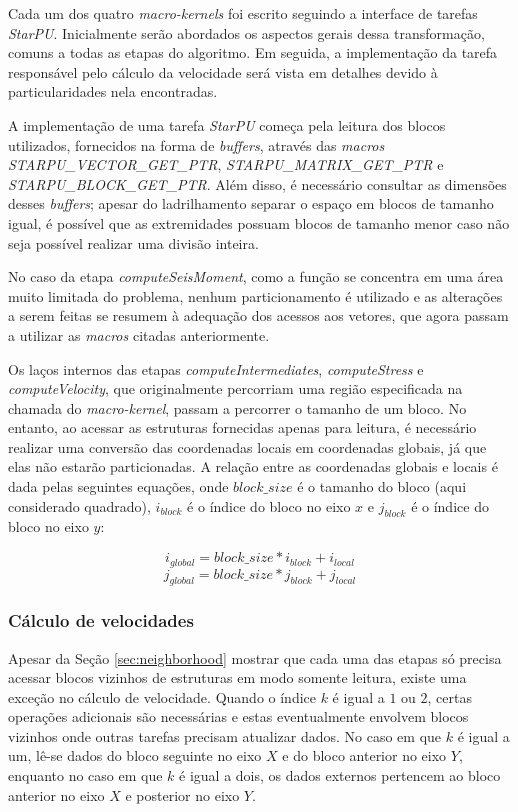 \documentclass[cic,tc]{iiufrgs}
\begin{document}
Cada um dos quatro \textit{macro-kernels} foi escrito seguindo a interface de tarefas \textit{StarPU}. Inicialmente serão abordados
os aspectos gerais dessa transformação, comuns a todas as etapas do algoritmo. Em seguida, a implementação da tarefa responsável
pelo cálculo da velocidade será vista em detalhes devido à particularidades nela encontradas.

A implementação de uma tarefa \textit{StarPU} começa pela leitura dos blocos utilizados, fornecidos na forma de \textit{buffers}, através 
das \textit{macros STARPU\_VECTOR\_GET\_PTR}, \textit{STARPU\_MATRIX\_GET\_PTR} e \textit{STARPU\_BLOCK\_GET\_PTR}. Além disso, é
necessário consultar as dimensões desses \textit{buffers}; apesar do ladrilhamento separar o espaço em blocos de tamanho igual, é possível
que as extremidades possuam blocos de tamanho menor caso não seja possível realizar uma divisão inteira.

No caso da etapa \textit{computeSeisMoment}, como a função se concentra em uma área muito limitada do problema, nenhum particionamento é utilizado e
as alterações a serem feitas se resumem à adequação dos acessos aos vetores, que agora passam a utilizar as \textit{macros} citadas anteriormente.

Os laços internos das etapas \textit{computeIntermediates}, \textit{computeStress} e \textit{computeVelocity}, que originalmente percorriam uma região especificada na chamada do \textit{macro-kernel}, passam a percorrer o tamanho de um bloco. No entanto, ao acessar as estruturas fornecidas apenas para leitura, é necessário realizar uma conversão das
coordenadas locais em coordenadas globais, já que elas não estarão particionadas. A relação entre as coordenadas globais e locais é dada
pelas seguintes equações, onde $block\_size$ é o tamanho do bloco (aqui considerado quadrado), $i_{block}$ é o índice do bloco no eixo $x$
e $j_{block}$ é o índice do bloco no eixo $y$:

\[ i_{global} = block\_size * i_{block} + i_{local} \]
\[ j_{global} = block\_size * j_{block} + j_{local} \]

\subsubsection*{Cálculo de velocidades}

Apesar da Seção \ref{sec:neighborhood} mostrar que cada uma das etapas só precisa acessar blocos vizinhos de estruturas em modo somente leitura, existe
uma exceção no cálculo de velocidade. Quando o índice $k$ é igual a $1$ ou $2$, certas operações adicionais são necessárias e estas
eventualmente envolvem blocos vizinhos onde outras tarefas precisam atualizar dados. No caso em que $k$ é igual a um, lê-se dados
do bloco seguinte no eixo $X$ e do bloco anterior no eixo $Y$, enquanto no caso em que $k$ é igual a dois, os dados externos pertencem
ao bloco anterior no eixo $X$ e posterior no eixo $Y$. 
\end{document}
